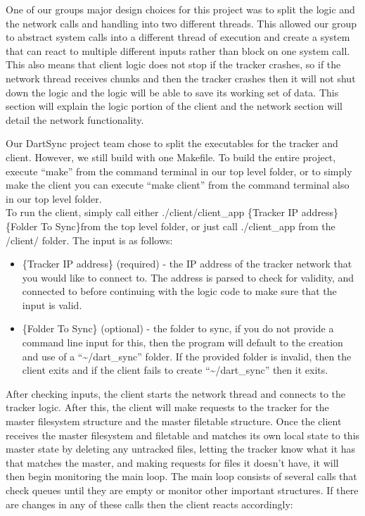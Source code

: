 	
	One of our groups major design choices for this project was to split the logic and the network calls and handling into two different threads.  This allowed our group to abstract system calls into a different thread of execution and create a system that can react to multiple different inputs rather than block on one system call.  This also means that client logic does not stop if the tracker crashes, so if the network thread receives chunks and then the tracker crashes then it will not shut down the logic and the logic will be able to save its working set of data.  This section will explain the logic portion of the client and the network section will detail the network functionality.


	Our DartSync project team chose to split the executables for the tracker and client.  However, we still build with one Makefile.  To build the entire project, execute ``make'' from the command terminal in our top level folder, or to simply make the client you can execute ``make client'' from the command terminal also in our top level folder.  \\

	To run the client, simply call either ./client/client_app \{Tracker IP address\} \{Folder To Sync\}from the top level folder, or just call ./client_app from the /client/ folder.  The input is as follows:
	
	\begin{itemize}
		\item \{Tracker IP address\} (required) - the IP address of the tracker network that you would like to connect to.  The address is parsed to check for validity, and connected to before continuing with the logic code to make sure that the input is valid.
		\item \{Folder To Sync\} (optional) - the folder to sync, if you do not provide a command line input for this, then the program will default to the creation and use of a ``\textasciitilde/dart_sync'' folder.  If the provided folder is invalid, then the client exits and if the client fails to create ``\textasciitilde/dart_sync'' then it exits.
	\end{itemize}


	After checking inputs, the client starts the network thread and connects to the tracker logic. After this, the client will make requests to the tracker for the master filesystem structure and the master filetable structure. Once the client receives the master filesystem and filetable and matches its own local state to this master state by deleting any untracked files, letting the tracker know what it has that matches the master, and making requests for files it doesn't have, it will then begin monitoring the main loop.  The main loop consists of several calls that check queues until they are empty or monitor other important structures.  If there are changes in any of these calls then the client reacts accordingly:

